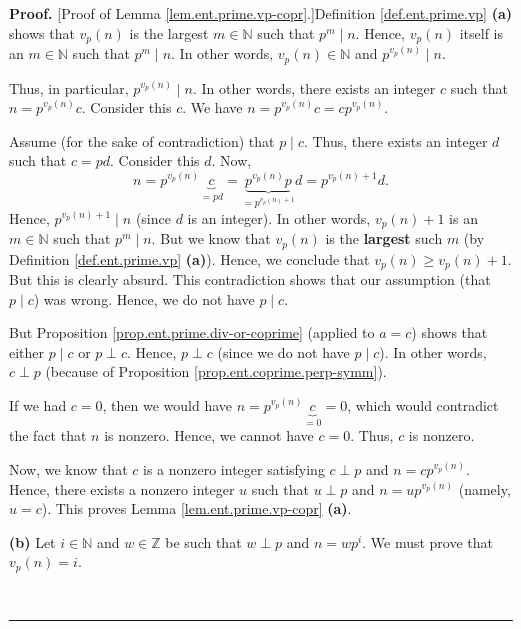 \documentclass[numbers=enddot,12pt,final,onecolumn,notitlepage]{scrartcl}%
\numberwithin{exer}{subsection}
\theoremstyle{definition}
\newenvironment{proof}[1][Proof]{\noindent\textbf{#1.} }{\ \rule{0.5em}{0.5em}}
\begin{document}
\begin{proof}
[Proof of Lemma \ref{lem.ent.prime.vp-copr}.]Definition \ref{def.ent.prime.vp}
\textbf{(a)} shows that $v_{p}\left(  n\right)  $ is the largest
$m\in\mathbb{N}$ such that $p^{m}\mid n$. Hence, $v_{p}\left(  n\right)  $
itself is an $m\in\mathbb{N}$ such that $p^{m}\mid n$. In other words,
$v_{p}\left(  n\right)  \in\mathbb{N}$ and $p^{v_{p}\left(  n\right)  }\mid n$.

Thus, in particular, $p^{v_{p}\left(  n\right)  }\mid n$. In other words,
there exists an integer $c$ such that $n=p^{v_{p}\left(  n\right)  }c$.
Consider this $c$. We have $n=p^{v_{p}\left(  n\right)  }c=cp^{v_{p}\left(
n\right)  }$.

Assume (for the sake of contradiction) that $p\mid c$. Thus, there exists an
integer $d$ such that $c=pd$. Consider this $d$. Now,%
\[
n=p^{v_{p}\left(  n\right)  }\underbrace{c}_{=pd}=\underbrace{p^{v_{p}\left(
n\right)  }p}_{=p^{v_{p}\left(  n\right)  +1}}d=p^{v_{p}\left(  n\right)
+1}d.
\]
Hence, $p^{v_{p}\left(  n\right)  +1}\mid n$ (since $d$ is an integer). In
other words, $v_{p}\left(  n\right)  +1$ is an $m\in\mathbb{N}$ such that
$p^{m}\mid n$. But we know that $v_{p}\left(  n\right)  $ is the
\textbf{largest} such $m$ (by Definition \ref{def.ent.prime.vp} \textbf{(a)}).
Hence, we conclude that $v_{p}\left(  n\right)  \geq v_{p}\left(  n\right)
+1$. But this is clearly absurd. This contradiction shows that our assumption
(that $p\mid c$) was wrong. Hence, we do not have $p\mid c$.

But Proposition \ref{prop.ent.prime.div-or-coprime} (applied to $a=c$) shows
that either $p\mid c$ or $p\perp c$. Hence, $p\perp c$ (since we do not have
$p\mid c$). In other words, $c\perp p$ (because of Proposition
\ref{prop.ent.coprime.perp-symm}).

If we had $c=0$, then we would have $n=p^{v_{p}\left(  n\right)
}\underbrace{c}_{=0}=0$, which would contradict the fact that $n$ is nonzero.
Hence, we cannot have $c=0$. Thus, $c$ is nonzero.

Now, we know that $c$ is a nonzero integer satisfying $c\perp p$ and
$n=cp^{v_{p}\left(  n\right)  }$. Hence, there exists a nonzero integer $u$
such that $u\perp p$ and $n=up^{v_{p}\left(  n\right)  }$ (namely, $u=c$).
This proves Lemma \ref{lem.ent.prime.vp-copr} \textbf{(a)}.

\textbf{(b)} Let $i\in\mathbb{N}$ and $w\in\mathbb{Z}$ be such that $w\perp p$
and $n=wp^{i}$. We must prove that $v_{p}\left(  n\right)  =i$.


\end{proof}
\end{document}
